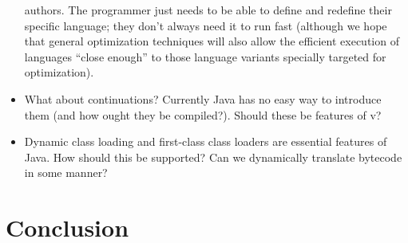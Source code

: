 \documentclass[11pt,notitlepage,twocolumn]{article}
\newcommand{\vlang}{\textsf{v}\xspace}
\begin{document}
\begin{itemize}
  authors.   The programmer just needs to be able to define and
  redefine their specific language; they don't always need it to run
  fast (although we hope that general optimization techniques will
  also allow the efficient execution of languages ``close enough'' to
  those language variants specially targeted for optimization).
\item What about continuations?  Currently Java has no easy way to
  introduce them (and how ought they be compiled?).  Should these be
  features of \vlang?
\item Dynamic class loading and first-class class loaders are
  essential features of Java.  How should this be supported?  Can we
  dynamically translate bytecode in some manner?
\end{itemize}

\section{Conclusion}


\end{document}
